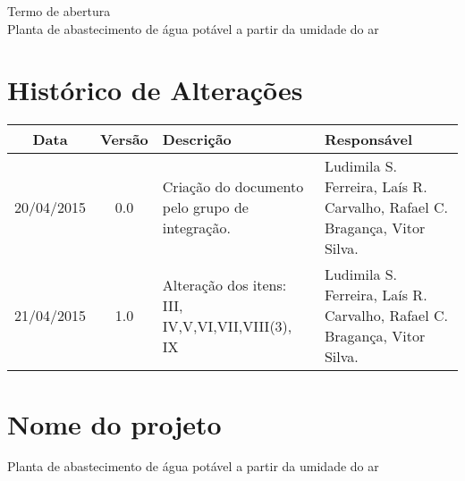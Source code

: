 % 
% 
% 


\begin{center}
 {\large Termo de abertura}\\[0.2cm]
 {Planta de abastecimento de água potável a partir da umidade do ar}\\
 \end{center}
 
 \section*{Histórico de Alterações}
\begin{table}[h]
\centering
\begin{tabular}{|c|c|p{6cm}|p{5cm}|}

Data & Versão & Descrição & Responsável\\
\hline                               
20/04/2015 & 0.0 & Criação do documento pelo grupo de integração. & Ludimila S. Ferreira,
Laís R. Carvalho, Rafael C. Bragança, Vitor Silva.\\
\hline
21/04/2015 & 1.0 & Alteração dos itens: III, IV,V,VI,VII,VIII(3), IX & Ludimila S. Ferreira,
Laís R. Carvalho, Rafael C. Bragança, Vitor Silva.\\
\hline
\end{tabular}
\end{table}

\section*{Nome do projeto}
  Planta de abastecimento de água potável a partir da umidade do ar
  
